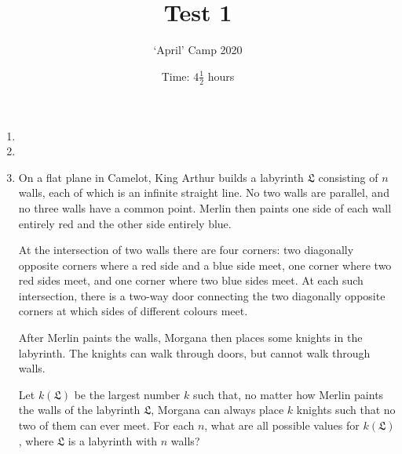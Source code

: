 \documentclass{article}
\title{Test 1}
\author{`April' Camp 2020}
\date{Time: $4\frac{1}{2}$ hours}
\begin{document}
\maketitle
\thispagestyle{empty}


\begin{enumerate}[1.]

\vfill
\item %


\vfill
\item %


\vfill
\item %
\newcommand{\LL}{\mathfrak{L}}
On a flat plane in Camelot, King Arthur builds a labyrinth $\LL$ consisting of $n$ walls, each of which is an infinite straight line.
No two walls are parallel, and no three walls have a common point.
Merlin then paints one side of each wall entirely red and the other side entirely blue.

At the intersection of two walls there are four corners: two diagonally opposite corners where a red side and a blue side meet, one corner where two red sides meet, and one corner where two blue sides meet.
At each such intersection, there is a two-way door connecting the two diagonally opposite corners at which sides of different colours meet.

After Merlin paints the walls, Morgana then places some knights in the labyrinth.
The knights can walk through doors, but cannot walk through walls.

Let $k(\LL)$ be the largest number $k$ such that, no matter how Merlin paints the walls of the labyrinth $\LL$, Morgana can always place $k$ knights such that no two of them can ever meet.
For each $n$, what are all possible values for $k(\LL)$, where $\LL$ is a labyrinth with $n$ walls?

\vfill
\end{enumerate}


\vfill
\centering
\begin{BVerbatim}
\end{BVerbatim}
\end{document}
